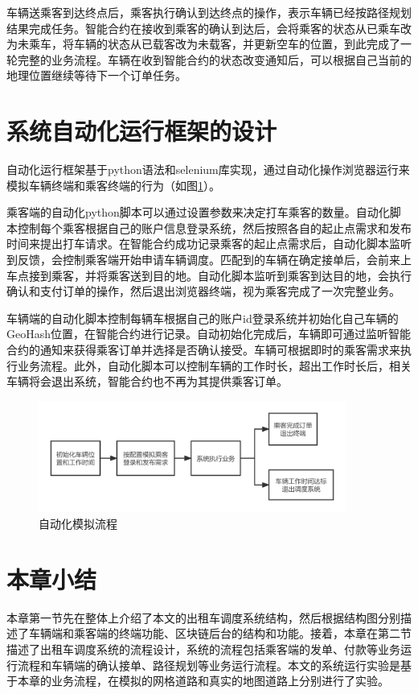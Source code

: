车辆送乘客到达终点后，乘客执行确认到达终点的操作，表示车辆已经按路径规划结果完成任务。智能合约在接收到乘客的确认到达后，会将乘客的状态从已乘车改为未乘车，将车辆的状态从已载客改为未载客，并更新空车的位置，到此完成了一轮完整的业务流程。车辆在收到智能合约的状态改变通知后，可以根据自己当前的地理位置继续等待下一个订单任务。


\section{系统自动化运行框架的设计}
自动化运行框架基于python语法和selenium库实现，通过自动化操作浏览器运行来模拟车辆终端和乘客终端的行为（如图\ref{fig:auto}）。

乘客端的自动化python脚本可以通过设置参数来决定打车乘客的数量。自动化脚本控制每个乘客根据自己的账户信息登录系统，然后按照各自的起止点需求和发布时间来提出打车请求。在智能合约成功记录乘客的起止点需求后，自动化脚本监听到反馈，会控制乘客端开始申请车辆调度。匹配到的车辆在确定接单后，会前来上车点接到乘客，并将乘客送到目的地。自动化脚本监听到乘客到达目的地，会执行确认和支付订单的操作，然后退出浏览器终端，视为乘客完成了一次完整业务。

车辆端的自动化脚本控制每辆车根据自己的账户id登录系统并初始化自己车辆的GeoHash位置，在智能合约进行记录。自动初始化完成后，车辆即可通过监听智能合约的通知来获得乘客订单并选择是否确认接受。车辆可根据即时的乘客需求来执行业务流程。此外，自动化脚本可以控制车辆的工作时长，超出工作时长后，相关车辆将会退出系统，智能合约也不再为其提供乘客订单。
\begin{figure}[h]
  \centering
  \includegraphics[width=0.9\textwidth]{figures/自动化流程}
  \caption{自动化模拟流程}\label{fig:auto}
\end{figure}

\section{本章小结}
本章第一节先在整体上介绍了本文的出租车调度系统结构，然后根据结构图分别描述了车辆端和乘客端的终端功能、区块链后台的结构和功能。接着，本章在第二节描述了出租车调度系统的流程设计，系统的流程包括乘客端的发单、付款等业务运行流程和车辆端的确认接单、路径规划等业务运行流程。本文的系统运行实验是基于本章的业务流程，在模拟的网格道路和真实的地图道路上分别进行了实验。
